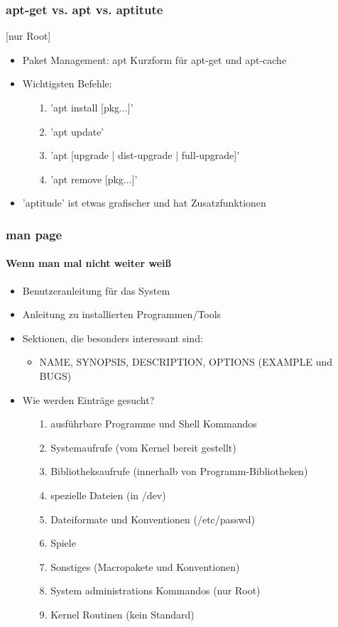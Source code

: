 \documentclass[12pt,utf8, handout]{beamer}
\begin{document}
\begin{frame}
\frametitle{apt-get vs. apt vs. aptitute}
[nur Root]
\begin{itemize}
	\item Paket Management: apt Kurzform für apt-get und apt-cache
	\item Wichtigsten Befehle:
	\begin{itemize}
		\item[1.] 'apt install [pkg...]'
		\item[2.] 'apt update'
		\item[3.] 'apt [upgrade | dist-upgrade | full-upgrade]'
		\item[4.] 'apt remove [pkg...]'
	\end{itemize}
	\item 'aptitude' ist etwas grafischer und hat Zusatzfunktionen
\end{itemize}
\end{frame}

\begin{frame}
\frametitle{man page}
\framesubtitle{Wenn man mal nicht weiter weiß}
\begin{itemize}
	\item Benutzeranleitung für das System
	\item Anleitung zu installierten Programmen/Tools
	\item Sektionen, die besonders interessant sind:
	\begin{itemize}
		\item NAME, SYNOPSIS, DESCRIPTION, OPTIONS (EXAMPLE und BUGS)
	\end{itemize}
	\item Wie werden Einträge gesucht?
	\begin{itemize}
		\item[1.] ausführbare Programme und Shell Kommandos
		\item[2.] Systemaufrufe (vom Kernel bereit gestellt)
		\item[3.] Bibliotheksaufrufe (innerhalb von Programm-Bibliotheken)
		\item[4.] spezielle Dateien (in /dev)
		\item[5.] Dateiformate und Konventionen (/etc/passwd)
		\item[6.] Spiele
		\item[7.] Sonstiges (Macropakete und Konventionen)
		\item[8.] System administrations Kommandos (nur Root)
		\item[9.] Kernel Routinen (kein Standard)
	\end{itemize}
\end{itemize}
\end{frame}
\end{document}
